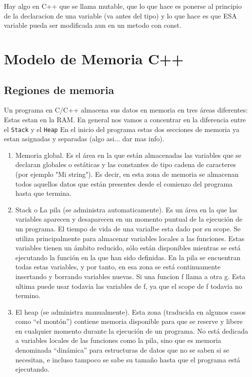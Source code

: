 \documentclass[11pt]{article}
\begin{document}
Hay algo en C++ que se llama mutable, que lo que hace es ponerse al principio de
la declaracion de una variable (va antes del tipo) y lo que hace es que ESA variable
pueda ser modificada aun en un metodo con const.




\section{Modelo de Memoria C++}


\subsection{Regiones de memoria}
Un programa en C/C++ almacena sus datos en memoria en tres áreas diferentes:
Estas estan en la RAM.
En general nos vamos a concentrar en la diferencia entre el \texttt{Stack} y el \texttt{Heap}
En el inicio del programa estas dos secciones de memoria ya estan asignadas y
separadas (algo asi... dar mas info).
\begin{enumerate}
    \item Memoria global.
        Es el área en la que están almacenadas las variables
        que se declaran globales o estáticas y las constantes de tipo cadena de caracteres (por ejemplo "Mi string").
        Es decir, en esta zona de memoria se almacenan todos aquellos datos que
        están presentes desde el comienzo del programa hasta que termina.
    \item Stack o La pila (se administra automaticamente).
        Es un área en la que las variables aparecen y desaparecen en un momento
        puntual de la ejecución de un programa.
        El tiempo de vida de una varialbe esta dado por su scope.
        Se utiliza principalmente para almacenar variables locales a las funciones.
        Estas variables tienen un ámbito reducido, sólo están disponibles mientras
        se está ejecutando la función en la que han sido definidas.
        En la pila se encuentran todas estas variables, y por tanto, en esa zona
        se está continuamente insertando y borrando variables nuevas.
        Si una funcion f llama a otra g. Esta ultima puede usar todavia las variables de
        f, ya que el scope de f todavia no termino.
    \item El heap (se administra manualmente).
        Esta zona (traducida en algunos casos como “el montón”) contiene memoria
        disponible para que se reserve y libere en cualquier momento durante la
        ejecución de un programa.
        No está dedicada a variables locales de las funciones como la pila, sino
        que es memoria denominada “dinámica” para estructuras de datos que no se
        saben si se necesitan, e incluso tampoco se sabe su tamaño hasta que el
        programa está ejecutando.
\end{enumerate}
\end{document}

